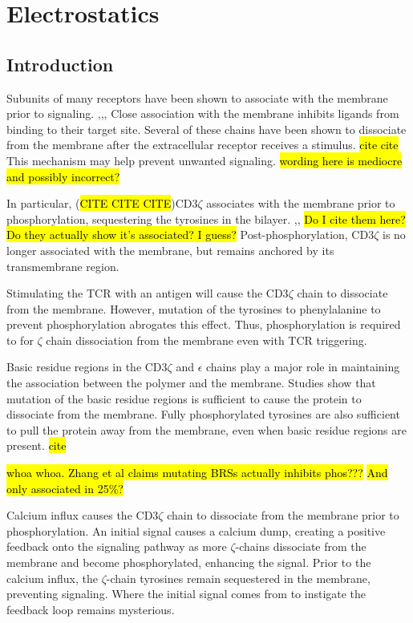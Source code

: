 \documentclass[../../AdvancementSummary.tex]{subfiles}
\begin{document}
\section{Electrostatics}

\subsection{Introduction}

Subunits of many receptors have been shown to associate with the membrane prior to signaling. \cite{Xu2008},\cite{Shi2013},\cite{Zhang2011},\cite{Dobbins2016} Close association with the membrane inhibits ligands from binding to their target site. Several of these chains have been shown to dissociate from the membrane after the extracellular receptor receives a stimulus. \hl{cite cite} This mechanism may help prevent unwanted signaling. \hl{wording here is mediocre and possibly incorrect?}

In particular, (\hl{CITE CITE CITE})CD3$\zeta$ associates with the membrane prior to phosphorylation, sequestering the tyrosines in the bilayer. \cite{Aivazian2000},\cite{Zhang2011},\cite{Shi2013} \hl{Do I cite them here? Do they actually show it's associated?  I guess?} Post-phosphorylation, CD3$\zeta$ is no longer associated with the membrane, but remains anchored by its transmembrane region. \cite{Aivazian2000}

Stimulating the TCR with an antigen will cause the CD3$\zeta$ chain to dissociate from the membrane. However, mutation of the tyrosines to phenylalanine to prevent phosphorylation abrogates this effect. Thus, phosphorylation is required to for $\zeta$ chain dissociation from the membrane even with TCR triggering. \cite{Zhang2011}

Basic residue regions in the CD3$\zeta$ and $\epsilon$ chains play a major role in maintaining the association between the polymer and the membrane. Studies show that mutation of the basic residue regions is sufficient to cause the protein to dissociate from the membrane.\cite{Zhang2011} Fully phosphorylated tyrosines are also sufficient to pull the protein away from the membrane, even when basic residue regions are present. \hl{cite} 

\hl{whoa whoa. Zhang et al claims mutating BRSs actually inhibits phos???}
\hl{And only associated in 25\%?}

Calcium influx causes the CD3$\zeta$ chain to dissociate from the membrane prior to phosphorylation. An initial signal causes a calcium dump, creating a positive feedback onto the signaling pathway as more $\zeta$-chains dissociate from the membrane and become phosphorylated, enhancing the signal.  \cite{Shi2013} Prior to the calcium influx, the $\zeta$-chain tyrosines remain sequestered in the membrane, preventing signaling. Where the initial signal comes from to instigate the feedback loop remains mysterious.
\end{document}

